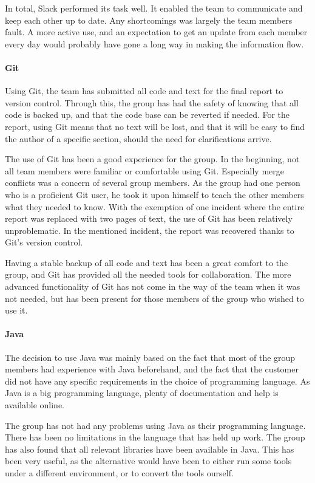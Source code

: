 \documentclass[11pt,a4paper,titlepage,oneside]{report}
\begin{document}
In total, Slack performed its task well. It enabled the team to communicate and keep each other up to date. Any shortcomings was largely the team members fault. A more active use, and an expectation to get an update from each member every day would probably have gone a long way in making the information flow.

\paragraph{Git}
Using Git, the team has submitted all code and text for the final report to version control. Through this, the group has had the safety of knowing that all code is backed up, and that the code base can be reverted if needed. For the report, using Git means that no text will be lost, and that it will be easy to find the author of a specific section, should the need for clarifications arrive. 

The use of Git has been a good experience for the group. In the beginning, not all team members were familiar or comfortable using Git. Especially merge conflicts was a concern of several group members. As the group had one person who is a proficient Git user, he took it upon himself to teach the other members what they needed to know. With the exemption of one incident where the entire report was replaced with two pages of text, the use of Git has been relatively unproblematic. In the mentioned incident, the report was recovered thanks to Git's version control. 

Having a stable backup of all code and text has been a great comfort to the group, and Git has provided all the needed tools for collaboration. The more advanced functionality of Git has not come in the way of the team when it was not needed, but has been present for those members of the group who wished to use it.

\paragraph{Java}
The decision to use Java was mainly based on the fact that most of the group members had experience with Java beforehand, and the fact that the customer did not have any specific requirements in the choice of programming language. As Java is a big programming language, plenty of documentation and help is available online. 

The group has not had any problems using Java as their programming language. There has been no limitations in the language that has held up work. The group has also found that all relevant libraries have been available in Java. This has been very useful, as the alternative would have been to either run some tools under a different environment, or to convert the tools ourself. 
\end{document}

